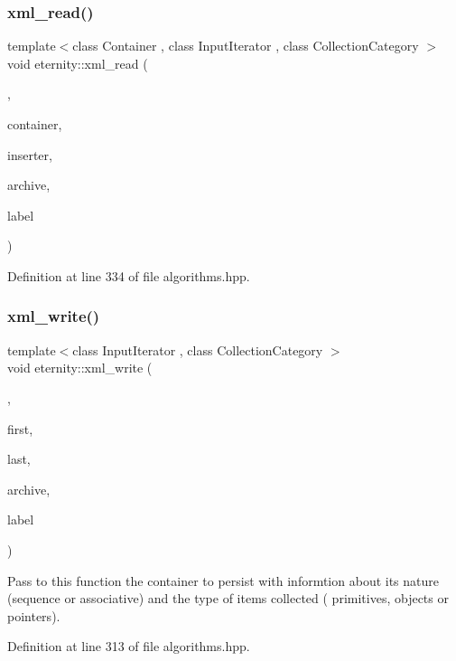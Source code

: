 \subsubsection{\texorpdfstring{xml\+\_\+read()}{xml\_read()}}
{\footnotesize\ttfamily template$<$class Container , class Input\+Iterator , class Collection\+Category $>$ \\
void eternity\+::xml\+\_\+read (\begin{DoxyParamCaption}\item[{Collection\+Category}]{,  }\item[{Container \&}]{container,  }\item[{Input\+Iterator}]{inserter,  }\item[{\hyperlink{classeternity_1_1xml__archive}{xml\+\_\+archive} \&}]{archive,  }\item[{std\+::string}]{label }\end{DoxyParamCaption})}



Definition at line 334 of file algorithms.\+hpp.

\mbox{\label{namespaceeternity_a839ed28b40afacc8ece1c9198aff5117}} 
\subsubsection{\texorpdfstring{xml\+\_\+write()}{xml\_write()}}
{\footnotesize\ttfamily template$<$class Input\+Iterator , class Collection\+Category $>$ \\
void eternity\+::xml\+\_\+write (\begin{DoxyParamCaption}\item[{Collection\+Category}]{,  }\item[{Input\+Iterator}]{first,  }\item[{Input\+Iterator}]{last,  }\item[{\hyperlink{classeternity_1_1xml__archive}{xml\+\_\+archive} \&}]{archive,  }\item[{std\+::string}]{label }\end{DoxyParamCaption})}

Pass to this function the container to persist with informtion about it\textquotesingle{}s nature (sequence or associative) and the type of items collected ( primitives, objects or pointers). 

Definition at line 313 of file algorithms.\+hpp.

